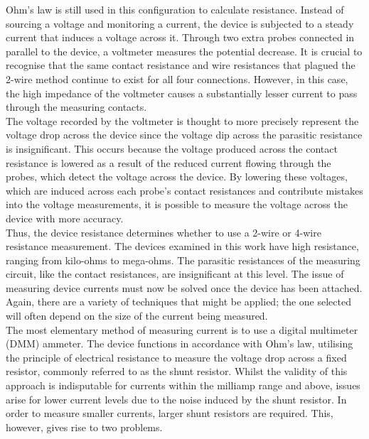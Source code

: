\noindent Ohm's law is still used in this configuration to calculate resistance. Instead of sourcing a voltage and monitoring a current, the device is subjected to a steady current that induces a voltage across it. Through two extra probes connected in parallel to the device, a voltmeter measures the potential decrease. It is crucial to recognise that the same contact resistance and wire resistances that plagued the 2-wire method continue to exist for all four connections. However, in this case, the high impedance of the voltmeter causes a substantially lesser current to pass through the measuring contacts. \\

\noindent The voltage recorded by the voltmeter is thought to more precisely represent the voltage drop across the device since the voltage dip across the parasitic resistance is insignificant. This occurs because the voltage produced across the contact resistance is lowered as a result of the reduced current flowing through the probes, which detect the voltage across the device. By lowering these voltages, which are induced across each probe's contact resistances and contribute mistakes into the voltage measurements, it is possible to measure the voltage across the device with more accuracy. \\

\noindent Thus, the device resistance determines whether to use a 2-wire or 4-wire resistance measurement. The devices examined in this work have high resistance, ranging from kilo-ohms to mega-ohms. The parasitic resistances of the measuring circuit, like the contact resistances, are insignificant at this level. The issue of measuring device currents must now be solved once the device has been attached. Again, there are a variety of techniques that might be applied; the one selected will often depend on the size of the current being measured. \\

\noindent The most elementary method of measuring current is to use a digital multimeter (DMM) ammeter. The device functions in accordance with Ohm's law, utilising the principle of electrical resistance to measure the voltage drop across a fixed resistor, commonly referred to as the shunt resistor. Whilst the validity of this approach is indisputable for currents within the milliamp range and above, issues arise for lower current levels due to the noise induced by the shunt resistor.  In order to measure smaller currents, larger shunt resistors are required. This, however, gives rise to two problems. \\

